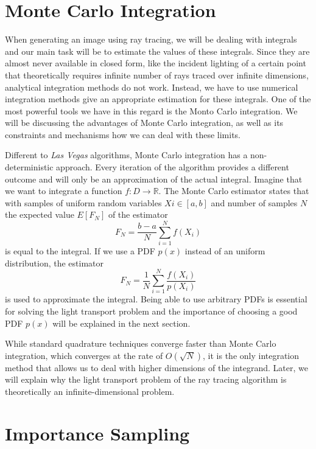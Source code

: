 \section{Monte Carlo Integration}
\label{ch:preliminaries:mci}

When generating an image using ray tracing, we will be dealing with integrals and our main task will be to estimate the values of these integrals. Since they are almost never available in closed form, like the incident lighting of a certain point that theoretically requires infinite number of rays traced over infinite dimensions, analytical integration methods do not work. Instead, we have to use numerical integration methods give an appropriate estimation for these integrals. One of the most powerful tools we have in this regard is the Monto Carlo integration. We will be discussing the advantages of Monte Carlo integration, as well as its constraints and mechanisms how we can deal with these limits.

Different to \textit{Las Vegas} algorithms, Monte Carlo integration has a non-deterministic approach. Every iteration of the algorithm provides a different outcome and will only be an approximation of the actual integral. Imagine that we want to integrate a function $f:D \rightarrow \mathbb{R}$. The Monte Carlo estimator states that with samples of uniform random variables $Xi \in [a,b]$ and number of samples $N$ the expected value $E[F_N]$ of the estimator 
\begin{equation}
F_N = \frac{b-a}{N}\sum_{i = 1}^{N}f(X_i)
\end{equation}
is equal to the integral. If we use a PDF $p(x)$ instead of an uniform distribution, the estimator
\begin{equation}
F_N = \frac{1}{N}\sum_{i = 1}^{N}\frac{f(X_i)}{p(X_i)}
\end{equation} 
is used to approximate the integral. Being able to use arbitrary PDFs is essential for solving the light transport problem and the importance of choosing a good PDF $p(x)$ will be explained in the next section.

While standard quadrature techniques converge faster than Monte Carlo integration, which converges at the rate of $O(\sqrt{N})$, it is the only integration method that allows us to deal with higher dimensions of the integrand. Later, we will explain why the light transport problem of the ray tracing algorithm is theoretically an infinite-dimensional problem. \cite{RMCM}


\section{Importance Sampling}
\label{ch:preliminaries:is}

